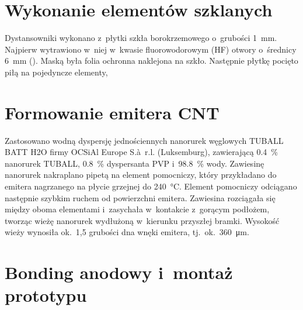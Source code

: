 \section{Wykonanie elementów szklanych}
\label{sec:szklo}

Dystansowniki wykonano z~płytki szkła borokrzemowego o~grubości
\SI{1}{\milli\metre}. Najpierw wytrawiono w~niej w~kwasie fluorowodorowym (HF) otwory
o~średnicy \SI{6}{\milli\metre} ().
Maską była folia ochronna naklejona na szkło. Następnie płytkę pocięto
piłą na pojedyncze elementy, 


\section{Formowanie emitera CNT}
\label{sec:nanoszenie-cnt}

 Zastosowano wodną dyspersję jednościennych
nanorurek węglowych TUBALL BATT H2O firmy OCSiAl Europe S.à~r.l.
(Luksemburg), zawierającą \SI{0.4}{\percent} nanorurek TUBALL,
\SI{0.8}{\percent} dyspersanta PVP i~\SI{98.8}{\percent} wody.
Zawiesinę nanorurek nakraplano pipetą na element
pomocniczy, który przykładano do emitera nagrzanego na płycie grzejnej
do \SI{240}{\celsius}. Element pomocniczy odciągano następnie szybkim
ruchem od powierzchni emitera. Zawiesina rozciągała się między oboma
elementami i~zasychała w~kontakcie z~gorącym podłożem, tworząc wieżę
nanorurek wydłużoną w~kierunku przyszłej bramki. Wysokość wieży
wynosiła ok.~1,5 grubości dna wnęki emitera, tj.~ok.~\SI{360}{\micro\metre}.

\section{Bonding anodowy i~montaż prototypu}
\label{sec:bonding-montaz}

